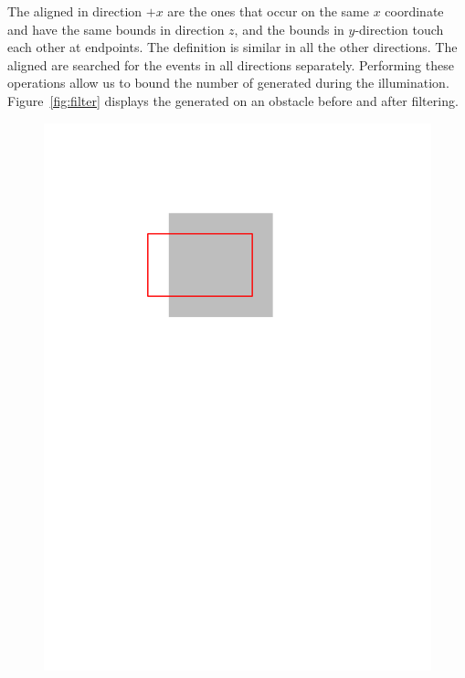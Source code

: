\documentclass[english,gradu]{tktltiki2018}
\begin{document}
The aligned \addEs in direction $+x$ are the ones that occur on the same $x$ coordinate and have the same bounds in direction $z$, and the bounds in $y$-direction touch each other at endpoints.
The definition is similar in all the other directions.
The aligned \addEs are searched for the events in all directions separately.
Performing these operations allow us to bound the number of \addEs generated during the illumination.
Figure~\ref{fig:filter} displays the generated \addEs on an obstacle before and after filtering.

\begin{figure}\centering
	\includegraphics[scale=0.5,page=1]{fig/filter}
	\hfil

\end{figure}
\end{document}
